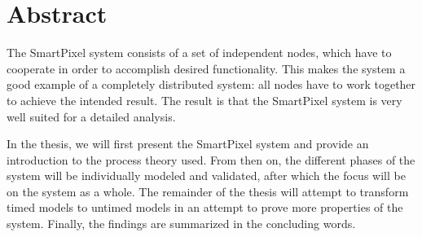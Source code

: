 \chapter*{Abstract}

The SmartPixel system consists of a set of independent nodes, which have to cooperate in order to accomplish desired functionality. This makes the system a good example of a completely distributed system: all nodes have to work together to achieve the intended result. The result is that the SmartPixel system is very well suited for a detailed analysis.

In the thesis, we will first present the SmartPixel system and provide an introduction to the process theory used. From then on, the different phases of the system will be individually modeled and validated, after which the focus will be on the system as a whole. The remainder of the thesis will attempt to transform timed models to untimed models in an attempt to prove more properties of the system. Finally, the findings are summarized in the concluding words.
